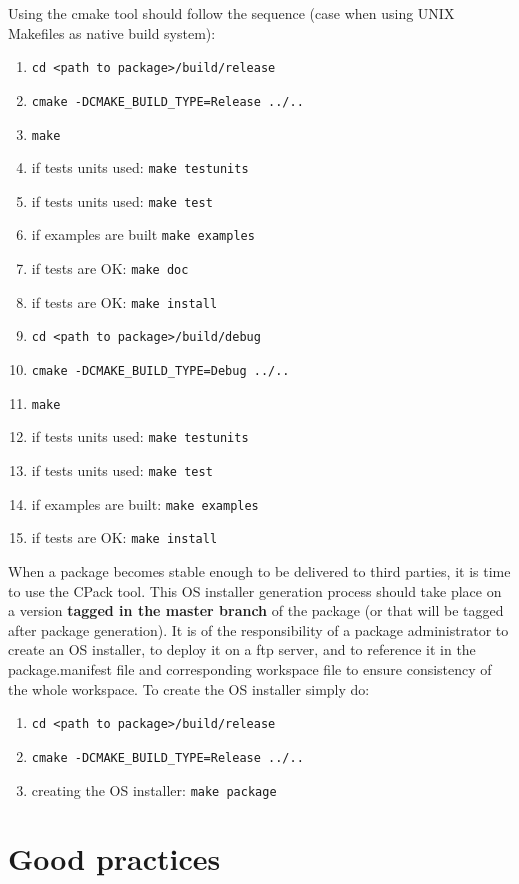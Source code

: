 \documentclass[12pt,a4paper]{article}
\begin{document}
Using the cmake tool should follow the sequence (case when using UNIX Makefiles as native build system):
\begin{enumerate}
\item \verb|cd <path to package>/build/release|
\item \verb|cmake -DCMAKE_BUILD_TYPE=Release ../..|
\item \verb|make|
\item if tests units used: \verb|make testunits|
\item if tests units used: \verb|make test|
\item if examples are built \verb|make examples|
\item if tests are OK: \verb|make doc|
\item if tests are OK: \verb|make install|
\item \verb|cd <path to package>/build/debug|
\item \verb|cmake -DCMAKE_BUILD_TYPE=Debug ../..|
\item \verb|make|
\item if tests units used: \verb|make testunits|
\item if tests units used: \verb|make test|
\item if examples are built: \verb|make examples|
\item if tests are OK: \verb|make install|
\end{enumerate}

When a package becomes stable enough to be delivered to third parties, it is time to use the CPack tool. This OS installer generation process should take place on a version \textbf{tagged in the master branch} of the package (or that will be tagged after package generation). It is of the responsibility of a package administrator to create an OS installer, to deploy it on a ftp server, and to reference it in the package.manifest file and corresponding workspace file to ensure consistency of the whole workspace. To create the OS installer simply do:
\begin{enumerate}
\item \verb|cd <path to package>/build/release|
\item \verb|cmake -DCMAKE_BUILD_TYPE=Release ../..|
\item creating the OS installer: \verb|make package|
\end{enumerate}

\pagebreak

\section{Good practices}
\end{document}
